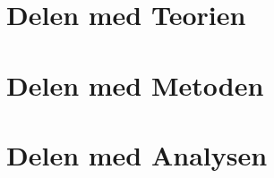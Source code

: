 	


	\part{Delen med Teorien \label{part_teori}}

 		

	\part{Delen med Metoden \label{part_metode}}
		 

		 	




	\part{Delen med Analysen \label{part_analyse}}

		
				
				




